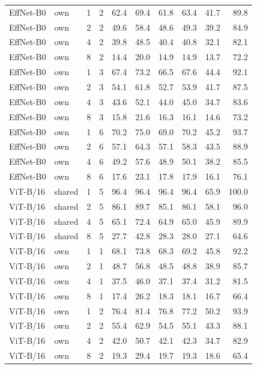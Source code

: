 \documentclass[10pt,a4paper]{article}
\begin{document}
\begin{longtable}{llrrrrrrrr}
EffNet-B0 & own & 1 & 2 & 62.4 & 69.4 & 61.8 & 63.4 & 41.7 & 89.8 \\
EffNet-B0 & own & 2 & 2 & 49.6 & 58.4 & 48.6 & 49.3 & 39.2 & 84.9 \\
EffNet-B0 & own & 4 & 2 & 39.8 & 48.5 & 40.4 & 40.8 & 32.1 & 82.1 \\
EffNet-B0 & own & 8 & 2 & 14.4 & 20.0 & 14.9 & 14.9 & 13.7 & 72.2 \\
EffNet-B0 & own & 1 & 3 & 67.4 & 73.2 & 66.5 & 67.6 & 44.4 & 92.1 \\
EffNet-B0 & own & 2 & 3 & 54.1 & 61.8 & 52.7 & 53.9 & 41.7 & 87.5 \\
EffNet-B0 & own & 4 & 3 & 43.6 & 52.1 & 44.0 & 45.0 & 34.7 & 83.6 \\
EffNet-B0 & own & 8 & 3 & 15.8 & 21.6 & 16.3 & 16.1 & 14.6 & 73.2 \\
EffNet-B0 & own & 1 & 6 & 70.2 & 75.0 & 69.0 & 70.2 & 45.2 & 93.7 \\
EffNet-B0 & own & 2 & 6 & 57.1 & 64.3 & 57.1 & 58.3 & 43.5 & 88.9 \\
EffNet-B0 & own & 4 & 6 & 49.2 & 57.6 & 48.9 & 50.1 & 38.2 & 85.5 \\
EffNet-B0 & own & 8 & 6 & 17.6 & 23.1 & 17.8 & 17.9 & 16.1 & 76.1 \\
ViT-B/16 & shared & 1 & 5 & 96.4 & 96.4 & 96.4 & 96.4 & 65.9 & 100.0 \\
ViT-B/16 & shared & 2 & 5 & 86.1 & 89.7 & 85.1 & 86.1 & 58.1 & 96.0 \\
ViT-B/16 & shared & 4 & 5 & 65.1 & 72.4 & 64.9 & 65.0 & 45.9 & 89.9 \\
ViT-B/16 & shared & 8 & 5 & 27.7 & 42.8 & 28.3 & 28.0 & 27.1 & 64.6 \\
ViT-B/16 & own & 1 & 1 & 68.1 & 73.8 & 68.3 & 69.2 & 45.8 & 92.2 \\
ViT-B/16 & own & 2 & 1 & 48.7 & 56.8 & 48.5 & 48.8 & 38.9 & 85.7 \\
ViT-B/16 & own & 4 & 1 & 37.5 & 46.0 & 37.1 & 37.4 & 31.2 & 81.5 \\
ViT-B/16 & own & 8 & 1 & 17.4 & 26.2 & 18.3 & 18.1 & 16.7 & 66.4 \\
ViT-B/16 & own & 1 & 2 & 76.4 & 81.4 & 76.8 & 77.2 & 50.2 & 93.9 \\
ViT-B/16 & own & 2 & 2 & 55.4 & 62.9 & 54.5 & 55.1 & 43.3 & 88.1 \\
ViT-B/16 & own & 4 & 2 & 42.0 & 50.7 & 42.1 & 42.3 & 34.7 & 82.9 \\
ViT-B/16 & own & 8 & 2 & 19.3 & 29.4 & 19.7 & 19.3 & 18.6 & 65.4 \\

\end{longtable}
\end{document}
